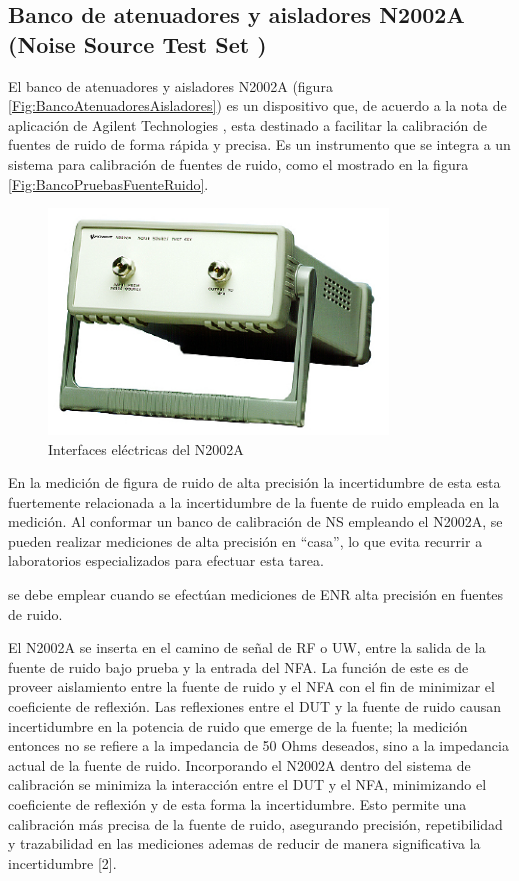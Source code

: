 \subsection{Banco de atenuadores y aisladores N2002A (Noise Source Test Set )}
El banco de atenuadores y aisladores N2002A (figura \ref{Fig:BancoAtenuadoresAisladores}) es un dispositivo que, de acuerdo a la nota de aplicación de Agilent Technologies \cite{AGI02}, esta destinado a facilitar la calibración de fuentes de ruido de forma rápida y precisa. Es un instrumento que se integra a un sistema para calibración de fuentes de ruido, como el mostrado en la figura \ref{Fig:BancoPruebasFuenteRuido}. 

\begin{figure}[h!]
	\centering
	\includegraphics[height=6cm]{./Imagenes/BancoAtenuadoresAisladoresN2002.pdf}
	\caption{Interfaces eléctricas del N2002A}			
	\label{Fig:BancoAtenuadoresAisladoresN2002.pdf}
\end{figure}			

En la medición de figura de ruido de alta precisión la incertidumbre de esta esta fuertemente relacionada a la incertidumbre de la fuente de ruido empleada en la medición. Al conformar un banco de calibración de NS empleando el N2002A, se pueden realizar mediciones de alta precisión en “casa”, lo que evita recurrir a laboratorios especializados	para efectuar esta tarea.

se debe emplear cuando se efectúan mediciones de ENR alta precisión en fuentes de ruido.

El N2002A se inserta en el camino de señal de RF o UW, entre la salida de la fuente de ruido bajo prueba y la entrada	del NFA. La función de este es de proveer aislamiento entre la fuente de ruido y el NFA con el fin de minimizar el	coeficiente de reflexión. Las reflexiones entre el DUT y la fuente de ruido causan incertidumbre en la potencia de ruido que emerge de la fuente; la medición entonces no se refiere a la impedancia de 50 Ohms deseados, sino a la impedancia actual de la fuente de ruido. Incorporando el N2002A dentro del sistema de calibración se minimiza la interacción entre el DUT y el NFA, minimizando el coeficiente de reflexión y de esta forma la incertidumbre. Esto
permite una calibración más precisa de la fuente de ruido, asegurando precisión, repetibilidad y trazabilidad en las	mediciones ademas de reducir de manera significativa la incertidumbre [2].

